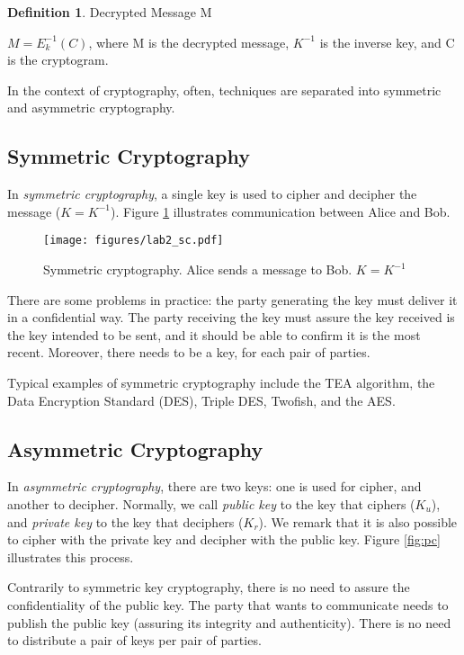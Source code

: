\documentclass[12pt,a4paper]{article}
\theoremstyle{definition}
\newtheorem{definition}{Definition}[section]
\begin{document}
\begin{definition}{Decrypted Message M}

$M = E_k^{-1}(C)$, where M is the decrypted message, $K^{-1}$ is the inverse key, and C is the cryptogram.
\end{definition}

In the context of cryptography, often, techniques are separated into symmetric and asymmetric cryptography.

\subsection{Symmetric Cryptography}
In \emph{symmetric cryptography}, a single key is used to cipher and decipher the message ($K = K^{-1}$). Figure \ref{fig:sc} illustrates communication between Alice and Bob.

\begin{figure}[h]
\centering
\texttt{[image: figures/lab2\_sc.pdf]}
\caption{Symmetric cryptography. Alice sends a message to Bob. $K = K^{-1}$}
\label{fig:sc}
\end{figure}

There are some problems in practice: the party generating the key must deliver it in a confidential way. The party receiving the key must assure the key received is the key intended to be sent, and it should be able to confirm it is the most recent. Moreover, there needs to be a key, for each pair of parties.

Typical examples of symmetric cryptography include the TEA algorithm, the Data Encryption Standard (DES), Triple DES, Twofish, and the AES.

\subsection{Asymmetric Cryptography}
In \emph{asymmetric cryptography}, there are two keys: one is used for cipher, and another to decipher. Normally, we call \emph{public key} to the key that ciphers ($K_u$), and \emph{private key} to the key that deciphers ($K_r$). We remark that it is also possible to cipher with the private key and decipher with the public key. Figure \ref{fig:pc} illustrates this process.

Contrarily to symmetric key cryptography, there is no need to assure the confidentiality of the public key. The party that wants to communicate needs to publish the public key (assuring its integrity and authenticity). There is no need to distribute a pair of keys per pair of parties.
\end{document}
